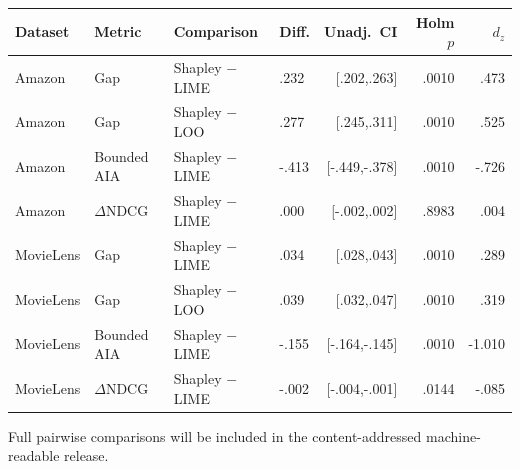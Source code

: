 \begin{center}
\scriptsize
{}
\label{tab:app-statistics}
\setlength{\tabcolsep}{2.5pt}
\begin{tabular}{@{}ll>{\raggedright\arraybackslash}p{}>{\raggedright\arraybackslash}p{}rrr@{}}
\toprule
Dataset & Metric & Comparison & Diff. & Unadj.\ CI & Holm $p$ & $d_z$ \\
\midrule
Amazon & Gap & Shapley $-$ LIME & .232 & [.202,.263] & .0010 & .473 \\
Amazon & Gap & Shapley $-$ LOO & .277 & [.245,.311] & .0010 & .525 \\
Amazon & Bounded AIA & Shapley $-$ LIME & -.413 & [-.449,-.378] & .0010 & -.726 \\
Amazon & $\Delta$NDCG & Shapley $-$ LIME & .000 & [-.002,.002] & .8983 & .004 \\
MovieLens & Gap & Shapley $-$ LIME & .034 & [.028,.043] & .0010 & .289 \\
MovieLens & Gap & Shapley $-$ LOO & .039 & [.032,.047] & .0010 & .319 \\
MovieLens & Bounded AIA & Shapley $-$ LIME & -.155 & [-.164,-.145] & .0010 & -1.010 \\
MovieLens & $\Delta$NDCG & Shapley $-$ LIME & -.002 & [-.004,-.001] & .0144 & -.085 \\
\bottomrule
\end{tabular}
\end{center}

\noindent Full pairwise comparisons will be included in the content-addressed machine-readable release.